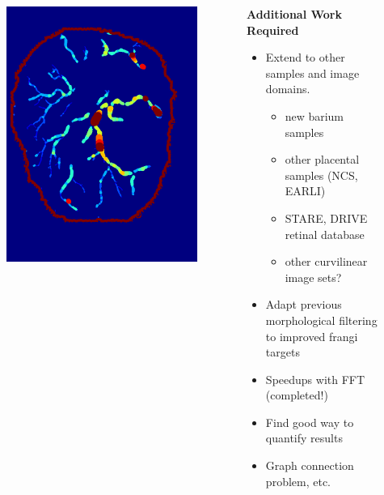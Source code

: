 \documentclass[9pt,notes]{beamer}
\begin{document}
\begin{frame}
\begin{columns}[c]
\begin{column}{0.5\textwidth}
\begin{figure}
\includegraphics[height=0.45\textheight]{nb_on_skel_labeled}
\end{figure}
\end{column}
\begin{column}{0.4\textwidth}
\textbf{Additional Work Required}
\begin{itemize}
\item Extend to other samples and image domains.
\begin{itemize}
	\item new barium samples
	\item other placental samples (NCS, EARLI)
	\item STARE, DRIVE retinal database
	\item other curvilinear image sets?
	
\end{itemize}
\item Adapt previous morphological filtering to improved frangi targets
\item Speedups with FFT (completed!)
\item Find good way to quantify results
\item Graph connection problem, etc.

\end{itemize}

\end{column}
\end{columns}
\end{frame}
\end{document}
